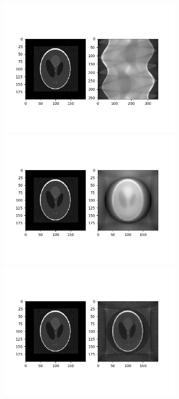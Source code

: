 \documentclass{article}
\begin{document}
\begin{figure}
\begin{center}
\includegraphics[width=0.8\textwidth]{./phantom/sinogram.jpg}
\includegraphics[width=0.8\textwidth]{./phantom/reconstructedImg.png}
\includegraphics[width=0.8\textwidth]{./phantom/reconstructedImg2.png}
\end{center}
\end{figure}
\end{document}
